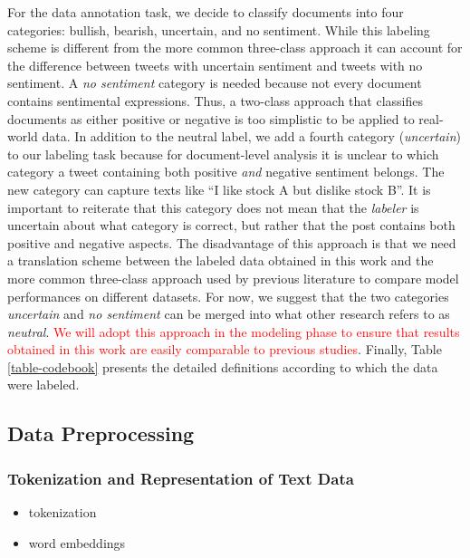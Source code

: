 For the data annotation task, we decide to classify documents into four categories: bullish, bearish, uncertain, and no sentiment. While this labeling scheme is different from the more common three-class approach it can account for the difference between tweets with uncertain sentiment and tweets with no sentiment. A \emph{no sentiment} category is needed because not every document contains sentimental expressions. Thus, a two-class approach that classifies documents as either positive or negative is too simplistic to be applied to real-world data. In addition to the neutral label, we add a fourth category (\emph{uncertain}) to our labeling task because for document-level analysis it is unclear to which category a tweet containing both positive \emph{and} negative sentiment belongs. The new category can capture texts like ``I like stock A but dislike stock B''. It is important to reiterate that this category does not mean that the \emph{labeler} is uncertain about what category is correct, but rather that the post contains both positive and negative aspects.
 The disadvantage of this approach is that we need a translation scheme between the labeled data obtained in this work and the more common three-class approach used by previous literature to compare model performances on different datasets. For now, we suggest that the two categories \emph{uncertain} and \emph{no sentiment} can be merged into what other research refers to as \emph{neutral}. \textcolor{red}{We will adopt this approach in the modeling phase to ensure that results obtained in this work are easily comparable to previous studies}.
 Finally, Table \ref{table-codebook} presents the detailed definitions according to which the data were labeled.








\subsection{Data Preprocessing}
\label{section-data-preprocessing}
\subsubsection{Tokenization and Representation of Text Data}
\begin{itemize}[noitemsep]
	\item tokenization
	\item word embeddings
\end{itemize}






